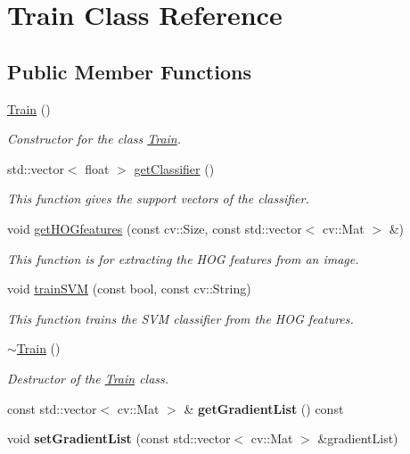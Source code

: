 \hypertarget{classTrain}{}\section{Train Class Reference}
\label{classTrain}
\subsection*{Public Member Functions}
\begin{DoxyCompactItemize}
\item 
\hyperlink{classTrain_aa05ce5a8ff68dea76d457f4ff2d0d1ba}{Train} ()\hypertarget{classTrain_aa05ce5a8ff68dea76d457f4ff2d0d1ba}{}\label{classTrain_aa05ce5a8ff68dea76d457f4ff2d0d1ba}

\begin{DoxyCompactList}\small\item\em Constructor for the class \hyperlink{classTrain}{Train}. \end{DoxyCompactList}\item 
std\+::vector$<$ float $>$ \hyperlink{classTrain_a72251742e0ed3d4871dffe8a05ebbc8c}{get\+Classifier} ()
\begin{DoxyCompactList}\small\item\em This function gives the support vectors of the classifier. \end{DoxyCompactList}\item 
void \hyperlink{classTrain_a6a98a6bbafe06950a62d5825a7eda62f}{get\+H\+O\+Gfeatures} (const cv\+::\+Size, const std\+::vector$<$ cv\+::\+Mat $>$ \&)
\begin{DoxyCompactList}\small\item\em This function is for extracting the H\+OG features from an image. \end{DoxyCompactList}\item 
void \hyperlink{classTrain_a7a7755ffab3240048df164cb4dff409c}{train\+S\+VM} (const bool, const cv\+::\+String)
\begin{DoxyCompactList}\small\item\em This function trains the S\+VM classifier from the H\+OG features. \end{DoxyCompactList}\item 
\hyperlink{classTrain_a28c78c0d21e7fbce79cb94927f23c11e}{$\sim$\+Train} ()
\begin{DoxyCompactList}\small\item\em Destructor of the \hyperlink{classTrain}{Train} class. \end{DoxyCompactList}\item 
const std\+::vector$<$ cv\+::\+Mat $>$ \& {\bfseries get\+Gradient\+List} () const \hypertarget{classTrain_a5d4a82b27e9ee2d51d87741db5accb88}{}\label{classTrain_a5d4a82b27e9ee2d51d87741db5accb88}

\item 
void {\bfseries set\+Gradient\+List} (const std\+::vector$<$ cv\+::\+Mat $>$ \&gradient\+List)\hypertarget{classTrain_a922b18b7e838985c3852646e53eec2f5}{}\label{classTrain_a922b18b7e838985c3852646e53eec2f5}

\end{DoxyCompactItemize}
